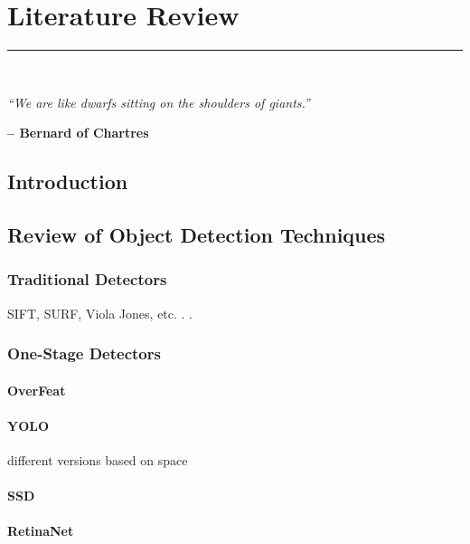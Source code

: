 \graphicspath{{content/chapters/3_literature/figures/}}

\chapter{Literature Review}%
\label{chp:literature}
\rule{\textwidth}{1pt} \\[1ex]

\epigraph{\textit{``We are like dwarfs sitting on the shoulders of giants.''}}{\textbf{-- Bernard of Chartres}}

\section{Introduction}
\label{sec:3_introduction}

\section{Review of Object Detection Techniques}
\label{sec:3_detection}

\subsection{Traditional Detectors}
\label{subsec:3_traditional_detectors}
\cite{od_3} SIFT, SURF, Viola Jones, etc. . .

\subsection{One-Stage Detectors}
\label{subsec:3_one-stage}

\subsubsection{OverFeat}
\label{subsubsec:3_overfeat}

\subsubsection{YOLO}
\label{subsubsec:3_yolo}
different versions based on space

\subsubsection{SSD}
\label{subsubsec:3_ssd}

\subsubsection{RetinaNet}
\label{subsubsec:3_retinanet}

